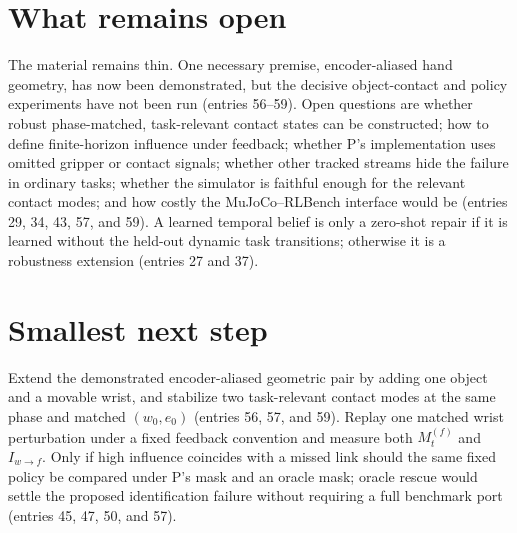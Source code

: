 \documentclass{article}
\begin{document}
\section{What remains open}
The material remains thin. One necessary premise, encoder-aliased hand geometry, has now been demonstrated, but the decisive object-contact and policy experiments have not been run (entries 56--59). Open questions are whether robust phase-matched, task-relevant contact states can be constructed; how to define finite-horizon influence under feedback; whether P's implementation uses omitted gripper or contact signals; whether other tracked streams hide the failure in ordinary tasks; whether the simulator is faithful enough for the relevant contact modes; and how costly the MuJoCo--RLBench interface would be (entries 29, 34, 43, 57, and 59). A learned temporal belief is only a zero-shot repair if it is learned without the held-out dynamic task transitions; otherwise it is a robustness extension (entries 27 and 37).

\section{Smallest next step}
Extend the demonstrated encoder-aliased geometric pair by adding one object and a movable wrist, and stabilize two task-relevant contact modes at the same phase and matched \((w_0,e_0)\) (entries 56, 57, and 59). Replay one matched wrist perturbation under a fixed feedback convention and measure both \(M_t^{(f)}\) and \(I_{w\to f}\). Only if high influence coincides with a missed link should the same fixed policy be compared under P's mask and an oracle mask; oracle rescue would settle the proposed identification failure without requiring a full benchmark port (entries 45, 47, 50, and 57).
\end{document}
